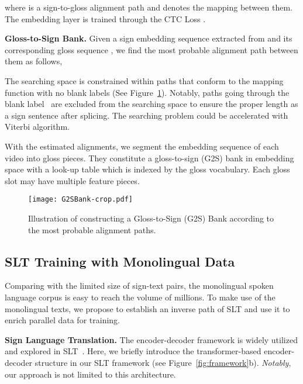 \documentclass[final]{cvpr}
\begin{document}
where  is a sign-to-gloss alignment path and  denotes the mapping between them. 
The embedding layer is trained through the CTC Loss . 

\textbf{Gloss-to-Sign Bank.} 
Given a sign embedding sequence  extracted from  and its corresponding gloss sequence , 
we find the most probable alignment path  between them as follows, 

The searching space is constrained within paths that conform to the mapping function  with no blank labels (See Figure~\ref{fig:G2Sbank}). 
Notably, paths going through the blank label~\cite{CTCLoss} are excluded from the searching space to ensure the proper length as a sign sentence after splicing. 
The searching problem could be accelerated with Viterbi algorithm\cite{viterbi1967error,DPD_icme19}. 

With the estimated alignments, we segment the embedding sequence of each video into gloss pieces. 
They constitute a gloss-to-sign (G2S) bank in embedding space with a look-up table which is indexed by the gloss vocabulary. 
Each gloss slot may have multiple feature pieces. 

\begin{figure}[tp]
   \centering
   \texttt{[image: G2SBank-crop.pdf]}
   \caption{Illustration of constructing a Gloss-to-Sign (G2S) Bank according to the most probable alignment paths. 
   }\label{fig:G2Sbank}
\vspace{-8pt}
\end{figure}



\subsection{SLT Training with Monolingual Data} \label{subsec:signbt}

Comparing with the limited size of sign-text pairs, the monolingual spoken language corpus is easy to reach the volume of millions. 
To make use of the monolingual texts, we propose to establish an inverse path of SLT and use it to enrich parallel data for training.  


\textbf{Sign Language Translation.}
The encoder-decoder framework is widely utilized and explored in SLT~\cite{slt-nslt-cihan18,slt-trans-cihan20}. 
Here, we briefly introduce the transformer-based encoder-decoder structure in our SLT framework (see Figure~\ref{fig:framework}b). 
\textit{Notably}, our approach is not limited to this architecture. 
\end{document}
